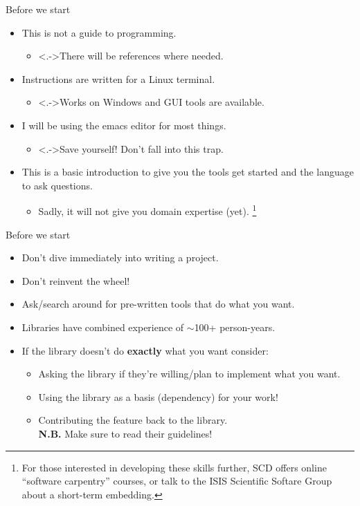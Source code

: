 \documentclass[usenames,dvipsnames]{beamer}
\begin{document}
\begin{frame}{Before we start}
    \begin{itemize}[<+->]
        \item{}This is not a guide to programming. 
        \begin{itemize}
            \item<.->{}There will be references where needed.
        \end{itemize}
        \item{}Instructions are written for a Linux terminal. 
        \begin{itemize}
            \item<.->{}Works on Windows and GUI tools are available.
        \end{itemize}
        \item{}I will be using the emacs editor for most things. 
        \begin{itemize}
            \item<.->{}Save yourself! Don't fall into this trap.
        \end{itemize}
        \item{}This is a basic introduction to give you the tools get started and the language to ask questions. 
        \begin{itemize}
            \item{}Sadly, it will not give you domain expertise (yet).
            \footnote{For those interested in developing these skills further, SCD offers online ``software carpentry'' courses, or talk to the ISIS Scientific Softare Group about a short-term embedding.}
        \end{itemize}
    \end{itemize}
\end{frame}

\begin{frame}{Before we start}
    \begin{itemize}[<+->]
        \item{}Don't dive immediately into writing a project.
        \item{}Don't reinvent the wheel!
        \item{}Ask/search around for pre-written tools that do what you want.
        \item{}Libraries have combined experience of $\sim{}\!$100+ person-years.
        \item{}If the library doesn't do \textbf{exactly} what you want consider:
        \begin{itemize}
            \item{}Asking the library if they're willing/plan to implement what you want.
            \item{}Using the library as a basis (dependency) for your work!
            \item{}Contributing the feature back to the library. \\ \textbf{N.B.} Make sure to read their guidelines!
        \end{itemize}
    \end{itemize}
\end{frame}
\end{document}

